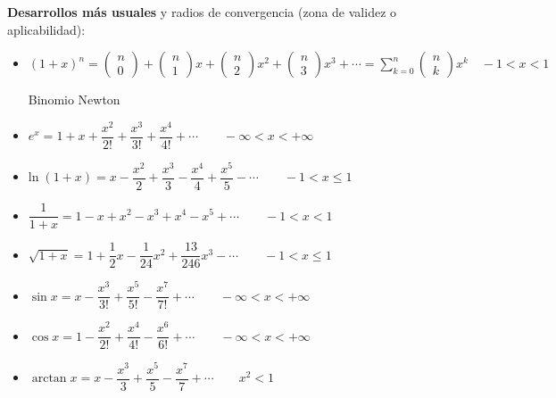 \begin{cuadro-naranja}
	
\color{gris}	
\textbf{Desarrollos más usuales} y radios de convergencia (zona de validez o aplicabilidad):
\begin{adjustwidth}{20pt}{0pt}
\begin{itemize}
	\item $(1+x)^n=\left( \begin{matrix} n \\ 0 \end{matrix} \right) +\left( \begin{matrix} n \\ 1 \end{matrix} \right) x+\left( \begin{matrix} n \\ 2 \end{matrix} \right) x^2+\left( \begin{matrix} n \\ 3 \end{matrix} \right) x^3+\cdots =\displaystyle \sum _{ k=0 }^{ n }{ \left( \begin{matrix} n \\ k \end{matrix} \right) { x }^{ k } } \quad -1<x<1 \ $ \begin{tiny} Binomio Newton \end{tiny}
	
	\item $e^x=1+x+\dfrac{x^2}{2!}+\dfrac{x^3}{3!}+\dfrac{x^4}{4!}+\cdots \qquad -\infty < x < +\infty$
	\item $\mathrm{ln}\; (1+x)=x-\dfrac{x^2}{2}+\dfrac{x^3}{3}-\dfrac{x^4}{4}+\dfrac{x^5}{5}- \cdots \qquad -1 < x \le 1 $
	
	\item $\dfrac{1}{1+x}=1-x+x^2-x^3+x^4-x^5+\cdots \qquad -1<x<1$
	
	\item $\sqrt{1+x} = 1 + \dfrac 1 2 x -\dfrac 1 {24} x^2 + \dfrac {13}{246}x^3- \cdots \qquad -1<x\le 1 $
	\item $\sin x = x -\dfrac{x^3}{3!}+\dfrac{x^5}{5!}-\dfrac{x^7}{7!}+\cdots \qquad -\infty < x < +\infty$
	\item $\cos x = 1 -\dfrac{x^2}{2!}+\dfrac{x^4}{4!}-\dfrac{x^6}{6!}+\cdots \qquad -\infty < x < +\infty$
	
	\item $\arctan x=x - \dfrac {x^3}{3} +\dfrac {x^5}{5}-\dfrac {x^7}{7}+\cdots \qquad x^2<1$	
	

\end{itemize}
\end{adjustwidth}
\end{cuadro-naranja}
